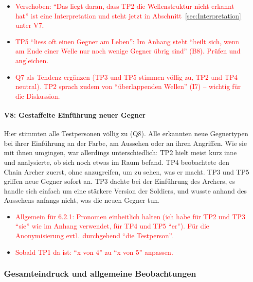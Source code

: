 \documentclass[../Main.tex]{subfiles}
\begin{document}
\begin{itemize}[leftmargin=1.5cm]
    \item \textcolor{red}{Verschoben: \enquote{Das liegt daran, dass TP2 die Wellenstruktur nicht erkannt hat} ist eine Interpretation und steht jetzt in Abschnitt~\ref{sec:Interpretation} unter V7.}
    \item \textcolor{red}{TP5 \enquote{liess oft einen Gegner am Leben}: Im Anhang steht \enquote{heilt sich, wenn am Ende einer Welle nur noch wenige Gegner übrig sind} (B8). Prüfen und angleichen.}
    \item \textcolor{red}{Q7 als Tendenz ergänzen (TP3 und TP5 stimmen völlig zu, TP2 und TP4 neutral). TP2 sprach zudem von \enquote{überlappenden Wellen} (I7) -- wichtig für die Diskussion.}
\end{itemize}

\paragraph{V8: Gestaffelte Einführung neuer Gegner}
Hier stimmten alle Testpersonen völlig zu (Q8). Alle erkannten neue Gegnertypen bei ihrer Einführung an der Farbe, am Aussehen oder an ihren Angriffen. Wie sie mit ihnen umgingen, war allerdings unterschiedlich: TP2 hielt meist kurz inne und analysierte, ob sich noch etwas im Raum befand. TP4 beobachtete den Chain Archer zuerst, ohne anzugreifen, um zu sehen, was er macht. TP3 und TP5 griffen neue Gegner sofort an. TP3 dachte bei der Einführung des Archers, es handle sich einfach um eine stärkere Version der Soldiers, und wusste anhand des Aussehens anfangs nicht, was die neuen Gegner tun.

\begin{itemize}[leftmargin=1.5cm]
    \item \textcolor{red}{Allgemein für 6.2.1: Pronomen einheitlich halten (ich habe für TP2 und TP3 \enquote{sie} wie im Anhang verwendet, für TP4 und TP5 \enquote{er}). Für die Anonymisierung evtl.\ durchgehend \enquote{die Testperson}.}
    \item \textcolor{red}{Sobald TP1 da ist: \enquote{x von 4} zu \enquote{x von 5} anpassen.}
\end{itemize}

\subsubsection{Gesamteindruck und allgemeine Beobachtungen} \label{sec:ErgAllgemein}
\end{document}
